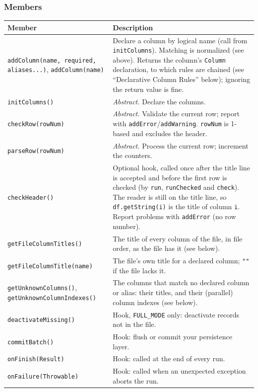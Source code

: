 \subsubsection*{Members}

\begin{longtable}{P{5.0cm}P{5.5cm}}
\toprule
\textbf{Member} & \textbf{Description} \\
\midrule
\endhead
\texttt{addColumn(name,}\allowbreak\ \texttt{required, aliases...)}, \texttt{addColumn(name)} & Declare a column by logical name (call from \texttt{initColumns}).  Matching is normalized (see above).  Returns the column's \texttt{Column} declaration, to which rules are chained (see ``Declarative Column Rules'' below); ignoring the return value is fine. \\
\texttt{initColumns()} & \emph{Abstract.}  Declare the columns. \\
\texttt{checkRow(rowNum)} & \emph{Abstract.}  Validate the current row; report with \texttt{addError}/\texttt{addWarning}.  \texttt{rowNum} is 1-based and excludes the header. \\
\texttt{parseRow(rowNum)} & \emph{Abstract.}  Process the current row; increment the counters. \\
\texttt{checkHeader()} & Optional hook, called once after the title line is accepted and before the first row is checked (by \texttt{run}, \texttt{runChecked} and \texttt{check}).  The reader is still on the title line, so \texttt{df.getString(i)} is the title of column \texttt{i}.  Report problems with \texttt{addError} (no row number). \\
\texttt{getFileColumnTitles()} & The title of every column of the file, in file order, as the file has it (see below). \\
\texttt{getFileColumnTitle(}\allowbreak\texttt{name)} & The file's own title for a declared column; \texttt{""} if the file lacks it. \\
\texttt{getUnknownColumns()}, \texttt{get\-Unknown\-Column\-Indexes()} & The columns that match no declared column or alias: their titles, and their (parallel) column indexes (see below). \\
\texttt{deactivateMissing()} & Hook, \texttt{FULL\_MODE} only: deactivate records not in the file. \\
\texttt{commitBatch()} & Hook: flush or commit your persistence layer. \\
\texttt{onFinish(Result)} & Hook: called at the end of every run. \\
\texttt{onFailure(Throwable)} & Hook: called when an unexpected exception aborts the run. \\

\end{longtable}
